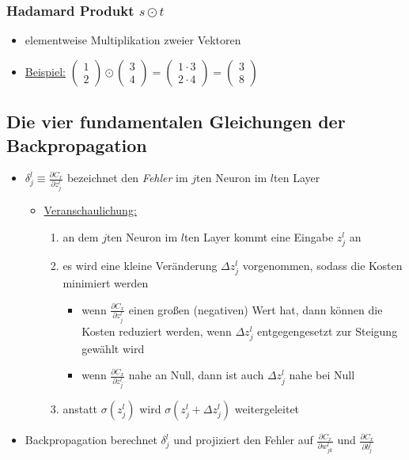 \subsubsection{Hadamard Produkt $s \odot t$}

\begin{itemize}
  \item elementweise Multiplikation zweier Vektoren
  \item \underline{Beispiel:} $\begin{pmatrix}1\\2\end{pmatrix} \odot \begin{pmatrix}3\\4\end{pmatrix}=\begin{pmatrix}1 \cdot 3\\2 \cdot 4\end{pmatrix}=\begin{pmatrix}3\\8\end{pmatrix}$
\end{itemize}

\subsection{Die vier fundamentalen Gleichungen der Backpropagation}

\begin{itemize}
  \item $\delta_j^l \equiv \frac{\partial C_x}{\partial z_j^l}$ bezeichnet den \emph{Fehler} im $j$ten Neuron im $l$ten Layer
  \begin{itemize}
    \item \underline{Veranschaulichung:}
    \begin{enumerate}
      \item an dem $j$ten Neuron im $l$ten Layer kommt eine Eingabe $z_j^l$ an
      \item es wird eine kleine Veränderung $\Delta z_j^l$ vorgenommen, sodass die Kosten minimiert werden
      \begin{itemize}
        \item wenn $\frac{\partial C_x}{\partial z_j^l}$ einen großen (negativen) Wert hat, dann können die Kosten reduziert werden, wenn $\Delta z_j^l$ entgegengesetzt zur Steigung gewählt wird
        \item wenn $\frac{\partial C_x}{\partial z_j^l}$ nahe an Null, dann ist auch $\Delta z_j^l$ nahe bei Null
      \end{itemize}
      \item anstatt $\sigma(z^l_j)$ wird $\sigma(z_j^l + \Delta z_j^l)$ weitergeleitet
    \end{enumerate}
  \end{itemize}
  \item Backpropagation berechnet $\delta_j^l$ und projiziert den Fehler auf $\frac{\partial C_x}{\partial w_{jk}^l}$ und $\frac{\partial C_x}{\partial b_j^l}$
\end{itemize}


